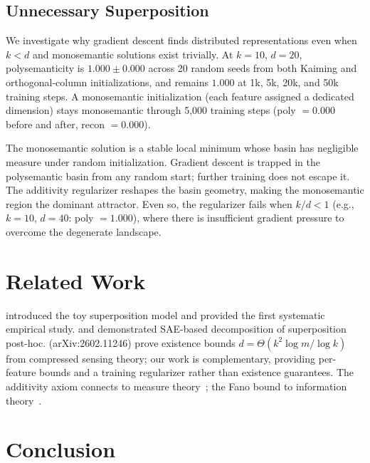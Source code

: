 \documentclass[11pt]{article}
\begin{document}
\subsection{Unnecessary Superposition}

We investigate why gradient descent finds distributed representations even when $k < d$
and monosemantic solutions exist trivially. At $k=10$, $d=20$, polysemanticity is
$1.000 \pm 0.000$ across 20 random seeds from both Kaiming and orthogonal-column
initializations, and remains $1.000$ at 1k, 5k, 20k, and 50k training steps. A monosemantic
initialization (each feature assigned a dedicated dimension) stays monosemantic through 5,000
training steps (poly $= 0.000$ before and after, recon $= 0.000$).

The monosemantic solution is a stable local minimum whose basin has negligible measure under
random initialization. Gradient descent is trapped in the polysemantic basin from any random
start; further training does not escape it. The additivity regularizer reshapes the basin
geometry, making the monosemantic region the dominant attractor. Even so, the regularizer
fails when $k/d < 1$ (e.g., $k=10$, $d=40$: poly $= 1.000$), where there is insufficient
gradient pressure to overcome the degenerate landscape.

\section{Related Work}

\citet{elhage2022toy} introduced the toy superposition model and provided the first
systematic empirical study. \citet{bricken2023monosemanticity} and \citet{cunningham2023sparse}
demonstrated SAE-based decomposition of superposition post-hoc.
\citet{arora2602existence} (arXiv:2602.11246) prove existence bounds $d = \Theta(k^2 \log m / \log k)$
from compressed sensing theory; our work is complementary, providing per-feature bounds and a
training regularizer rather than existence guarantees. The additivity axiom connects to measure
theory~\citep{halmos1950measure}; the Fano bound to information theory~\citep{fano1949transmission}.

\section{Conclusion}
\end{document}
